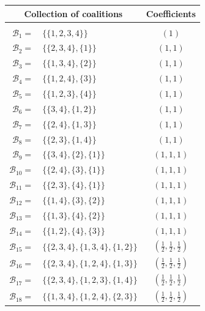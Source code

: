 \documentclass[10pt,a4paper,titlepage]{article}
\theoremstyle{plain}
\theoremstyle{definition}
\begin{document}
\begin{tabular}{ | r l | c | }
    \multicolumn{2}{c}{Collection of coalitions} & \multicolumn{1}{c}{Coefficients}\\
    \hline & & \\[-10pt]
    $\mathcal{B}_{1} =$ & $\{\{1,2,3,4\}\}$ & $\left(1\right)$\\[2pt]
    $\mathcal{B}_{2} =$ & $\{\{2,3,4\}, \{1\}\}$ & $\left(1, 1\right)$\\[2pt]
    $\mathcal{B}_{3} =$ & $\{\{1,3,4\}, \{2\}\}$ & $\left(1, 1\right)$\\[2pt]
    $\mathcal{B}_{4} =$ & $\{\{1,2,4\}, \{3\}\}$ & $\left(1, 1\right)$\\[2pt]
    $\mathcal{B}_{5} =$ & $\{\{1,2,3\}, \{4\}\}$ & $\left(1, 1\right)$\\[2pt]
    $\mathcal{B}_{6} =$ & $\{\{3,4\}, \{1,2\}\}$ & $\left(1, 1\right)$\\[2pt]
    $\mathcal{B}_{7} =$ & $\{\{2,4\}, \{1,3\}\}$ & $\left(1, 1\right)$\\[2pt]
    $\mathcal{B}_{8} =$ & $\{\{2,3\}, \{1,4\}\}$ & $\left(1, 1\right)$\\[2pt]
    $\mathcal{B}_{9} =$ & $\{\{3,4\}, \{2\}, \{1\}\}$ & $\left(1, 1, 1\right)$\\[2pt]
    $\mathcal{B}_{10} =$ & $\{\{2,4\}, \{3\}, \{1\}\}$ & $\left(1, 1, 1\right)$\\[2pt]
    $\mathcal{B}_{11} =$ & $\{\{2,3\}, \{4\}, \{1\}\}$ & $\left(1, 1, 1\right)$\\[2pt]
    $\mathcal{B}_{12} =$ & $\{\{1,4\}, \{3\}, \{2\}\}$ & $\left(1, 1, 1\right)$\\[2pt]
    $\mathcal{B}_{13} =$ & $\{\{1,3\}, \{4\}, \{2\}\}$ & $\left(1, 1, 1\right)$\\[2pt]
    $\mathcal{B}_{14} =$ & $\{\{1,2\}, \{4\}, \{3\}\}$ & $\left(1, 1, 1\right)$\\[2pt]
    $\mathcal{B}_{15} =$ & $\{\{2,3,4\}, \{1,3,4\}, \{1,2\}\}$ & $\left(\frac{1}{2}, \frac{1}{2}, \frac{1}{2}\right)$\\[2pt]
    $\mathcal{B}_{16} =$ & $\{\{2,3,4\}, \{1,2,4\}, \{1,3\}\}$ & $\left(\frac{1}{2}, \frac{1}{2}, \frac{1}{2}\right)$\\[2pt]
    $\mathcal{B}_{17} =$ & $\{\{2,3,4\}, \{1,2,3\}, \{1,4\}\}$ & $\left(\frac{1}{2}, \frac{1}{2}, \frac{1}{2}\right)$\\[2pt]
    $\mathcal{B}_{18} =$ & $\{\{1,3,4\}, \{1,2,4\}, \{2,3\}\}$ & $\left(\frac{1}{2}, \frac{1}{2}, \frac{1}{2}\right)$\\[2pt]

\end{tabular}
\end{document}
